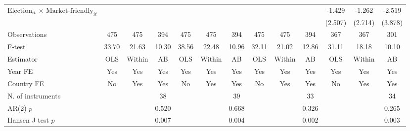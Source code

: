\begin{longtable}{m{4cm}*{12}{c}}
\multirow{2}{4cm}{$\text{Election}_{it}$ $\times$ $\text{Market-friendly}_{it}$}&               &               &               &               &               &               &               &               &               &      -1.429   &      -1.262   &      -2.519   \\
                    &               &               &               &               &               &               &               &               &               &     (2.507)   &     (2.714)   &     (3.878)   \\
\midrule
Observations        &         475   &         475   &         394   &         475   &         475   &         394   &         475   &         475   &         394   &         367   &         367   &         301   \\
F-test              &       33.70   &       21.63   &       10.30   &       38.56   &       22.48   &       10.96   &       32.11   &       21.02   &       12.86   &       31.11   &       18.18   &       10.10   \\
Estimator           &         OLS   &      Within   &          AB   &         OLS   &      Within   &          AB   &         OLS   &      Within   &          AB   &         OLS   &      Within   &          AB   \\
Year FE             &         Yes   &         Yes   &         Yes   &         Yes   &         Yes   &         Yes   &         Yes   &         Yes   &         Yes   &         Yes   &         Yes   &         Yes   \\
Country FE          &          No   &         Yes   &         Yes   &          No   &         Yes   &         Yes   &          No   &         Yes   &         Yes   &          No   &         Yes   &         Yes   \\
N. of instruments   &               &               &          38   &               &               &          39   &               &               &          33   &               &               &          34   \\
AR(2) \(p\)         &               &               &       0.520   &               &               &       0.668   &               &               &       0.326   &               &               &       0.265   \\
Hansen J test \(p\) &               &               &       0.007   &               &               &       0.004   &               &               &       0.002   &               &               &       0.003   \\

\end{longtable}
